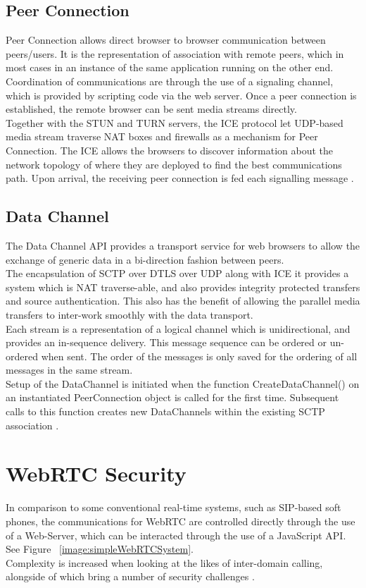 \subsection{Peer Connection}
Peer Connection allows direct browser to browser communication between peers/users. It is the representation of association with remote peers, which in most cases in an instance of the same application running on the other end. Coordination of communications are through the use of a signaling channel, which is provided by scripting code via the web server. Once a peer connection is established, the remote browser can be sent media streams directly.
\\ Together with the STUN and TURN servers, the ICE protocol let UDP-based media stream traverse NAT boxes and firewalls as a mechanism for Peer Connection. The ICE allows the browsers to discover information about the network topology of where they are deployed to find the best communications path. Upon arrival, the receiving peer connection is fed each signalling message \cite{loreto2014real}.

\subsection{Data Channel}
The Data Channel API provides a transport service for web browsers to allow the exchange of generic data in a bi-direction fashion between peers.
\\ The encapsulation of SCTP over DTLS over UDP along with ICE it provides a system which is NAT traverse-able, and also provides integrity protected transfers and source authentication. This also has the benefit of allowing the parallel media transfers to inter-work smoothly with the data transport.
\\ Each stream is a representation of a logical channel which is unidirectional, and provides an in-sequence delivery. This message sequence can be ordered or un-ordered when sent. The order of the messages is only saved for the ordering of all messages in the same stream.
\\ Setup of the DataChannel is initiated when the function CreateDataChannel() on an instantiated PeerConnection object is called for the first time. Subsequent calls to this function creates new DataChannels within the existing SCTP association \cite{loreto2014real}.

\section{WebRTC Security}
In comparison to some conventional real-time systems, such as SIP-based soft phones, the communications for WebRTC are controlled directly through the use of a Web-Server, which can be interacted through the use of a JavaScript API. See Figure ~\ref{image:simpleWebRTCSystem}.
\\Complexity is increased when looking at the likes of inter-domain calling, alongside of which bring a number of security challenges \cite{rescorla2013webrtc}.

